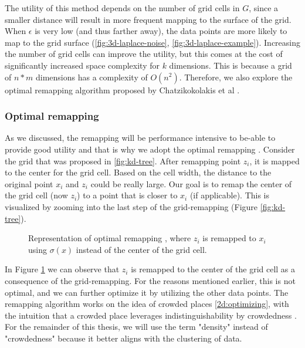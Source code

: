 The utility of this method depends on the number of grid cells in $G$, since a smaller distance will result in more frequent mapping to the surface of the grid.
When $\epsilon$ is very low (and thus farther away), the data points are more likely to map to the grid surface (\ref{fig:3d-laplace-noise}, \ref{fig:3d-laplace-example}).
Increasing the number of grid cells can improve the utility, but this comes at the cost of significantly increased space complexity for $k$ dimensions.
This is because a grid of $n*m$ dimensions has a complexity of $O(n^2)$.
Therefore, we also explore the optimal remapping algorithm proposed by Chatzikokolakis et al \citep{chatzikokolakis_efficient_2017}.


\newpage
\subsubsection{Optimal remapping} \label{theory:optimal-remapping}
As we discussed, the remapping will be performance intensive to be-able to provide good utility and that is why we adopt the optimal remapping \citep{chatzikokolakis_efficient_2017}.
Consider the grid that was proposed in \ref{fig:kd-tree}.
After remapping point $z_i$, it is mapped to the center for the grid cell.
Based on the cell width, the distance to the original point $x_i$ and $ z_i$ could be really large.
Our goal is to remap the center of the grid cell (now $z_i$) to a point that is closer to $x_i$ (if applicable). \newline
This is visualized by zooming into the last step of the grid-remapping (Figure \ref{fig:kd-tree}).
\begin{figure}[H]
  
  \caption{Representation of optimal remapping \citep{chatzikokolakis_efficient_2017}, where $z_i$ is remapped to $x_i$ using $\sigma(x)$ instead of the center of the grid cell.}
  \label{fig:optimal-remapping}
\end{figure}
In Figure \ref{fig:optimal-remapping} we can observe that $z_i$ is remapped to the center of the grid cell as a consequence of the grid-remapping.
For the reasons mentioned earlier, this is not optimal, and we can further optimize it by utilizing the other data points.
The remapping algorithm works on the idea of crowded places \ref{2d:optimizing}, with the intuition that a crowded place leverages indistinguishability by crowdedness \citep{chatzikokolakis_efficient_2017}.
For the remainder of this thesis, we will use the term "density" instead of "crowdedness" because it better aligns with the clustering of data.

